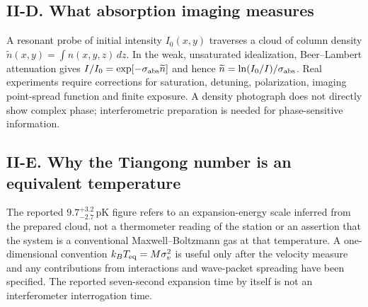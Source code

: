 \documentclass[11pt,a4paper]{article}
\begin{document}
\subsection*{II-D. What absorption imaging measures}
A resonant probe of initial intensity $I_0(x,y)$ traverses a cloud of column density $\widetilde n(x,y)=\int n(x,y,z)\,dz$. In the weak, unsaturated idealization, Beer--Lambert attenuation gives $I/I_0=\exp[-\sigma_{\rm abs}\widetilde n]$ and hence $\widetilde n=\ln(I_0/I)/\sigma_{\rm abs}$. Real experiments require corrections for saturation, detuning, polarization, imaging point-spread function and finite exposure. A density photograph does not directly show complex phase; interferometric preparation is needed for phase-sensitive information.
\subsection*{II-E. Why the Tiangong number is an equivalent temperature}
The reported $9.7^{+3.2}_{-2.7}\,$pK figure refers to an expansion-energy scale inferred from the prepared cloud, not a thermometer reading of the station or an assertion that the system is a conventional Maxwell--Boltzmann gas at that temperature. A one-dimensional convention $k_BT_{\rm eq}=M\sigma_v^2$ is useful only after the velocity measure and any contributions from interactions and wave-packet spreading have been specified. The reported seven-second expansion time by itself is not an interferometer interrogation time.
\end{document}
